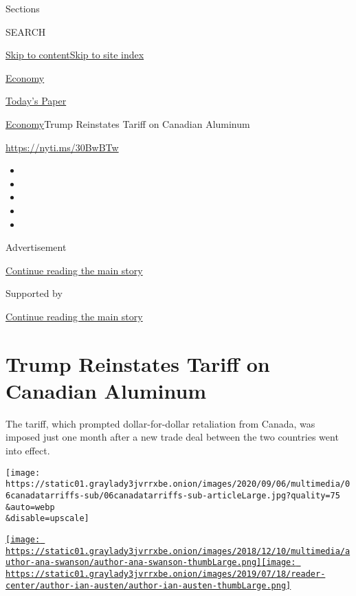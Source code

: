 Sections

SEARCH

\protect\hyperlink{site-content}{Skip to
content}\protect\hyperlink{site-index}{Skip to site index}

\href{https://www.nytimes3xbfgragh.onion/section/business/economy}{Economy}

\href{https://myaccount.nytimes3xbfgragh.onion/auth/login?response_type=cookie\&client_id=vi}{}

\href{https://www.nytimes3xbfgragh.onion/section/todayspaper}{Today's
Paper}

\href{/section/business/economy}{Economy}\textbar{}Trump Reinstates
Tariff on Canadian Aluminum

\url{https://nyti.ms/30BwBTw}

\begin{itemize}
\item
\item
\item
\item
\item
\end{itemize}

Advertisement

\protect\hyperlink{after-top}{Continue reading the main story}

Supported by

\protect\hyperlink{after-sponsor}{Continue reading the main story}

\hypertarget{trump-reinstates-tariff-on-canadian-aluminum}{%
\section{Trump Reinstates Tariff on Canadian
Aluminum}\label{trump-reinstates-tariff-on-canadian-aluminum}}

The tariff, which prompted dollar-for-dollar retaliation from Canada,
was imposed just one month after a new trade deal between the two
countries went into effect.

\texttt{[image: https://static01.graylady3jvrrxbe.onion/images/2020/09/06/multimedia/06canadatarriffs-sub/06canadatarriffs-sub-articleLarge.jpg?quality=75\\\&auto=webp\\\&disable=upscale]}

\href{https://www.nytimes3xbfgragh.onion/by/ana-swanson}{\texttt{[image: https://static01.graylady3jvrrxbe.onion/images/2018/12/10/multimedia/author-ana-swanson/author-ana-swanson-thumbLarge.png]}}\href{https://www.nytimes3xbfgragh.onion/by/ian-austen}{\texttt{[image: https://static01.graylady3jvrrxbe.onion/images/2019/07/18/reader-center/author-ian-austen/author-ian-austen-thumbLarge.png]}}

